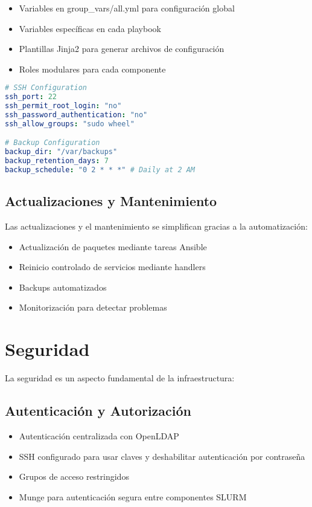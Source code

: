 \documentclass[12pt,a4paper]{article}
\begin{document}
\begin{itemize}[leftmargin=*]
    \item Variables en group\_vars/all.yml para configuración global
    \item Variables específicas en cada playbook
    \item Plantillas Jinja2 para generar archivos de configuración
    \item Roles modulares para cada componente
\end{itemize}

\begin{lstlisting}[language=yaml, caption=Extracto de variables globales en group_vars/all.yml]
# SSH Configuration
ssh_port: 22
ssh_permit_root_login: "no"
ssh_password_authentication: "no"
ssh_allow_groups: "sudo wheel"

# Backup Configuration
backup_dir: "/var/backups"
backup_retention_days: 7
backup_schedule: "0 2 * * *" # Daily at 2 AM
\end{lstlisting}

\subsection{Actualizaciones y Mantenimiento}

Las actualizaciones y el mantenimiento se simplifican gracias a la automatización:

\begin{itemize}[leftmargin=*]
    \item Actualización de paquetes mediante tareas Ansible
    \item Reinicio controlado de servicios mediante handlers
    \item Backups automatizados
    \item Monitorización para detectar problemas
\end{itemize}

\section{Seguridad}
\newpage

La seguridad es un aspecto fundamental de la infraestructura:

\subsection{Autenticación y Autorización}

\begin{itemize}[leftmargin=*]
    \item Autenticación centralizada con OpenLDAP
    \item SSH configurado para usar claves y deshabilitar autenticación por contraseña
    \item Grupos de acceso restringidos
    \item Munge para autenticación segura entre componentes SLURM
\end{itemize}
\end{document}

